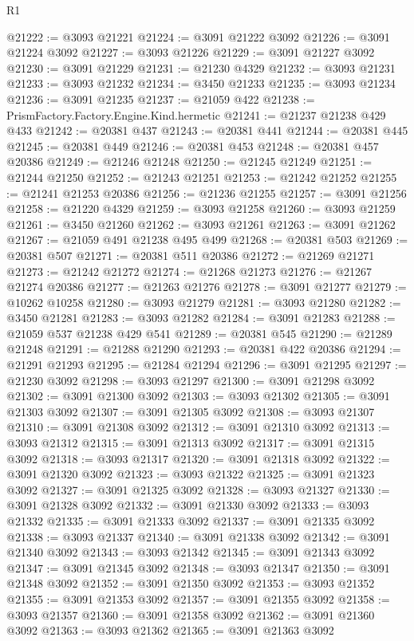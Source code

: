 \begin{lexlean}{R1}
\begin{coremodule}
@21222 := @3093 @21221
@21224 := @3091 @21222 @3092
@21226 := @3091 @21224 @3092
@21227 := @3093 @21226
@21229 := @3091 @21227 @3092
@21230 := @3091 @21229
@21231 := @21230 @4329
@21232 := @3093 @21231
@21233 := @3093 @21232
@21234 := @3450 @21233
@21235 := @3093 @21234
@21236 := @3091 @21235
@21237 := @21059 @422
@21238 := PrismFactory.Factory.Engine.Kind.hermetic
@21241 := @21237 @21238 @429 @433
@21242 := @20381 @437
@21243 := @20381 @441
@21244 := @20381 @445
@21245 := @20381 @449
@21246 := @20381 @453
@21248 := @20381 @457 @20386
@21249 := @21246 @21248
@21250 := @21245 @21249
@21251 := @21244 @21250
@21252 := @21243 @21251
@21253 := @21242 @21252
@21255 := @21241 @21253 @20386
@21256 := @21236 @21255
@21257 := @3091 @21256
@21258 := @21220 @4329
@21259 := @3093 @21258
@21260 := @3093 @21259
@21261 := @3450 @21260
@21262 := @3093 @21261
@21263 := @3091 @21262
@21267 := @21059 @491 @21238 @495 @499
@21268 := @20381 @503
@21269 := @20381 @507
@21271 := @20381 @511 @20386
@21272 := @21269 @21271
@21273 := @21242 @21272
@21274 := @21268 @21273
@21276 := @21267 @21274 @20386
@21277 := @21263 @21276
@21278 := @3091 @21277
@21279 := @10262 @10258
@21280 := @3093 @21279
@21281 := @3093 @21280
@21282 := @3450 @21281
@21283 := @3093 @21282
@21284 := @3091 @21283
@21288 := @21059 @537 @21238 @429 @541
@21289 := @20381 @545
@21290 := @21289 @21248
@21291 := @21288 @21290
@21293 := @20381 @422 @20386
@21294 := @21291 @21293
@21295 := @21284 @21294
@21296 := @3091 @21295
@21297 := @21230 @3092
@21298 := @3093 @21297
@21300 := @3091 @21298 @3092
@21302 := @3091 @21300 @3092
@21303 := @3093 @21302
@21305 := @3091 @21303 @3092
@21307 := @3091 @21305 @3092
@21308 := @3093 @21307
@21310 := @3091 @21308 @3092
@21312 := @3091 @21310 @3092
@21313 := @3093 @21312
@21315 := @3091 @21313 @3092
@21317 := @3091 @21315 @3092
@21318 := @3093 @21317
@21320 := @3091 @21318 @3092
@21322 := @3091 @21320 @3092
@21323 := @3093 @21322
@21325 := @3091 @21323 @3092
@21327 := @3091 @21325 @3092
@21328 := @3093 @21327
@21330 := @3091 @21328 @3092
@21332 := @3091 @21330 @3092
@21333 := @3093 @21332
@21335 := @3091 @21333 @3092
@21337 := @3091 @21335 @3092
@21338 := @3093 @21337
@21340 := @3091 @21338 @3092
@21342 := @3091 @21340 @3092
@21343 := @3093 @21342
@21345 := @3091 @21343 @3092
@21347 := @3091 @21345 @3092
@21348 := @3093 @21347
@21350 := @3091 @21348 @3092
@21352 := @3091 @21350 @3092
@21353 := @3093 @21352
@21355 := @3091 @21353 @3092
@21357 := @3091 @21355 @3092
@21358 := @3093 @21357
@21360 := @3091 @21358 @3092
@21362 := @3091 @21360 @3092
@21363 := @3093 @21362
@21365 := @3091 @21363 @3092

\end{coremodule}
\end{lexlean}

